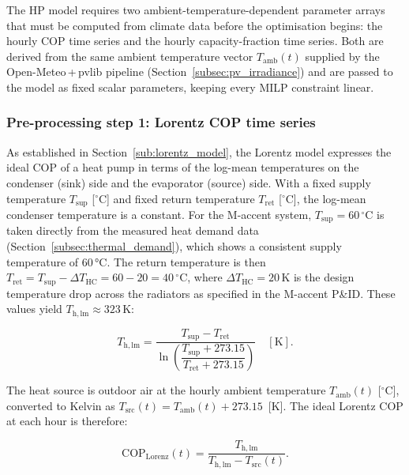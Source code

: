 \documentclass[11pt,a4paper]{report}
\begin{document}
The HP model requires two ambient-temperature-dependent parameter arrays that must
be computed from climate data before the optimisation begins: the hourly COP time
series and the hourly capacity-fraction time series.
Both are derived from the same ambient temperature vector $T_\mathrm{amb}(t)$ supplied
by the Open-Meteo\,+\,pvlib pipeline (Section~\ref{subsec:pv_irradiance}) and are passed
to the model as fixed scalar parameters, keeping every MILP constraint linear.

\subsubsection{Pre-processing step 1: Lorentz COP time series}
\label{sub:hthp_cop_preprocess}

As established in Section~\ref{sub:lorentz_model}, the Lorentz model expresses the ideal COP
of a heat pump in terms of the log-mean temperatures on the condenser (sink) side and the
evaporator (source) side.
With a fixed supply temperature $T_\mathrm{sup}$ [$^{\circ}$C] and fixed return temperature
$T_\mathrm{ret}$ [$^{\circ}$C], the log-mean condenser temperature is a constant.
For the M-accent system, $T_\mathrm{sup} = 60\,^{\circ}$C is taken directly from the
measured heat demand data (Section~\ref{subsec:thermal_demand}), which shows a consistent
supply temperature of 60\,°C.
The return temperature is then $T_\mathrm{ret} = T_\mathrm{sup} - \Delta T_\mathrm{HC}
= 60 - 20 = 40\,^{\circ}$C, where $\Delta T_\mathrm{HC} = 20\,\mathrm{K}$ is the
design temperature drop across the radiators as specified in the M-accent P\&ID.
These values yield $T_\mathrm{h,lm} \approx 323\,\mathrm{K}$:

\begin{equation}
    T_{\mathrm{h,lm}} =
    \frac{T_\mathrm{sup} - T_\mathrm{ret}}
         {\ln\!\left(\dfrac{T_\mathrm{sup}+273.15}{T_\mathrm{ret}+273.15}\right)}
    \quad [\mathrm{K}].
    \label{eq:T_hlm}
\end{equation}

The heat source is outdoor air at the hourly ambient temperature $T_\mathrm{amb}(t)$
[$^{\circ}$C], converted to Kelvin as $T_\mathrm{src}(t) = T_\mathrm{amb}(t)+273.15$~[K].
The ideal Lorentz COP at each hour is therefore:

\begin{equation}
    \mathrm{COP}_\mathrm{Lorenz}(t)
    = \frac{T_{\mathrm{h,lm}}}{T_{\mathrm{h,lm}} - T_\mathrm{src}(t)}.
    \label{eq:cop_lorenz_t}
\end{equation}
\end{document}
